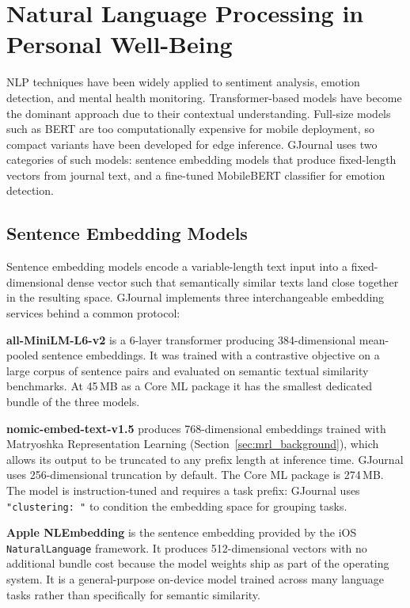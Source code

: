 \section{Natural Language Processing in Personal Well-Being}

NLP techniques have been widely applied to sentiment analysis, emotion detection, and mental health monitoring. Transformer-based models have become the dominant approach due to their contextual understanding. Full-size models such as BERT \cite{devlin2019bert} are too computationally expensive for mobile deployment, so compact variants have been developed for edge inference. GJournal uses two categories of such models: sentence embedding models that produce fixed-length vectors from journal text, and a fine-tuned MobileBERT \cite{sun2020mobilebert} classifier for emotion detection.

\subsection{Sentence Embedding Models}
\label{sec:sentence_embeddings}

Sentence embedding models encode a variable-length text input into a fixed-dimensional dense vector such that semantically similar texts land close together in the resulting space. GJournal implements three interchangeable embedding services behind a common protocol:

\textbf{all-MiniLM-L6-v2} \cite{reimers2019sentencebert} is a 6-layer transformer producing 384-dimensional mean-pooled sentence embeddings. It was trained with a contrastive objective on a large corpus of sentence pairs and evaluated on semantic textual similarity benchmarks. At 45\,MB as a Core ML package it has the smallest dedicated bundle of the three models.

\textbf{nomic-embed-text-v1.5} \cite{nussbaum2024nomic} produces 768-dimensional embeddings trained with Matryoshka Representation Learning (Section~\ref{sec:mrl_background}), which allows its output to be truncated to any prefix length at inference time. GJournal uses 256-dimensional truncation by default. The Core ML package is 274\,MB. The model is instruction-tuned and requires a task prefix: GJournal uses \texttt{"clustering: "} to condition the embedding space for grouping tasks.

\textbf{Apple NLEmbedding} is the sentence embedding provided by the iOS%
\newline \texttt{NaturalLanguage} framework. It produces 512-dimensional vectors with no additional bundle cost because the model weights ship as part of the operating system. It is a general-purpose on-device model trained across many language tasks rather than specifically for semantic similarity.

